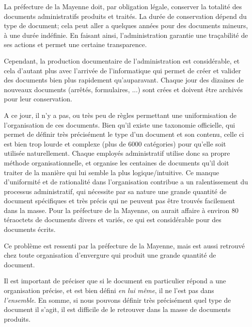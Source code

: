La préfecture de la Mayenne doit, par obligation légale, conserver la totalité des documents administratifs produits et traités.
La durée de conservation dépend du type de document; cela peut aller a quelques années pour des documents mineurs, à une durée indéfinie.
En faisant ainsi, l'administration garantie une traçabilité de ses actions et permet une certaine transparence. 
\\
\par
Cependant, la production documentaire de l'administration est considérable, et cela d'autant plus avec l'arrivée de l'informatique qui permet de créer et valider des documents bien plus rapidement qu'auparavant.
Chaque jour des dizaines de nouveaux documents (arrêtés, formulaires, ...) sont crées et doivent être archivés pour leur conservation.
\\
\par
A ce jour, il n'y a pas, ou très peu de règles permettant une uniformisation de l'organisation de ces documents.
Bien qu'il existe une taxonomie officielle, qui permet de définir très précisément le type d'un document et son contenu, celle ci est bien trop lourde et complexe (plus de 6000 catégories) pour qu'elle soit utilisée naturellement.
Chaque employés administratif utilise donc sa propre méthode organisationnelle, et organise les centaines de documents qu'il doit traiter de la manière qui lui semble la plus logique/intuitive.
Ce manque d'uniformité et de rationalité dans l'organisation contribue a un ralentissement du processus administratif, qui nécessite par sa nature une grande quantité de document spécifiques et très précis qui ne peuvent pas être trouvés facilement dans la masse.
Pour la préfecture de la Mayenne, on aurait affaire à environ 80 téraoctets de documents divers et variés, ce qui est considérable pour des documents écrits. 
\\
\par
Ce problème est ressenti par la préfecture de la Mayenne, mais est aussi retrouvé chez toute organisation d'envergure qui produit une grande quantité de document. 
\\
\par
Il est important de préciser que si le document en particulier répond a une organisation précise, et est bien défini \textit{en lui même}, il ne l'est pas dans \textit{l'ensemble}.
En somme, si nous pouvons définir très précisément quel type de document il s'agit, il est difficile de le retrouver dans la masse de documents produits.
